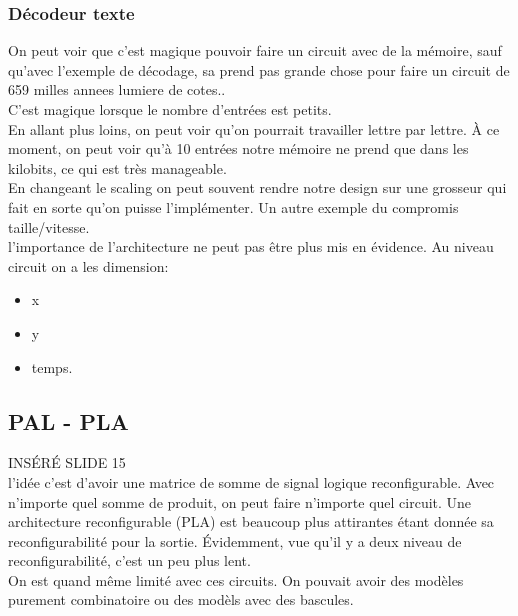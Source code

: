\documentclass[oneside]{book}
\begin{document}
        \subsubsection{Décodeur texte}
        On peut voir que c'est magique pouvoir faire un circuit avec de la mémoire, sauf qu'avec l'exemple de décodage, sa prend pas grande chose pour faire un circuit de 659 milles annees lumiere de cotes..\\
        
        C'est magique lorsque le nombre d'entrées est petits.\\
        
        En allant plus loins, on peut voir qu'on pourrait travailler lettre par lettre. À ce moment, on peut voir qu'à 10 entrées notre mémoire ne prend que dans les kilobits, ce qui est très manageable.\\
        
        En changeant le scaling on peut souvent rendre notre design sur une grosseur qui fait en sorte qu'on puisse l'implémenter. Un autre exemple du compromis taille/vitesse.\\
        
        l'importance de l'architecture ne peut pas être plus mis en évidence. Au niveau circuit on a les dimension:
        \begin{itemize}
            \item x
            \item y
            \item temps.
        \end{itemize}
    
        \subsection{PAL - PLA}
        INSÉRÉ SLIDE 15\\
        
        l'idée c'est d'avoir une matrice de somme de signal logique reconfigurable. Avec n'importe quel somme de produit, on peut faire n'importe quel circuit. Une architecture reconfigurable (PLA) est beaucoup plus attirantes étant donnée sa reconfigurabilité pour la sortie. Évidemment, vue qu'il y a deux niveau de reconfigurabilité, c'est un peu plus lent.\\
        
        On est quand même limité avec ces circuits. On pouvait avoir des modèles purement combinatoire ou des modèls avec des bascules.\\
        
\end{document}
